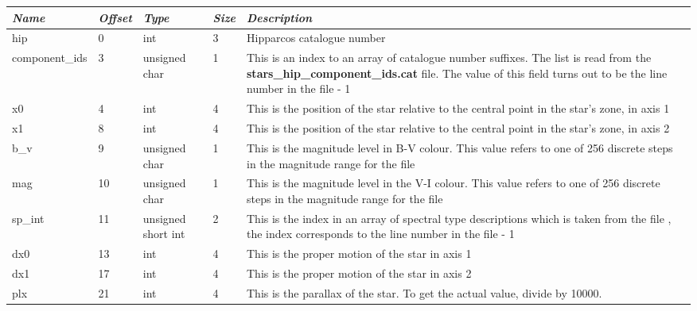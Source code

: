 \begin{longtabu} to \textwidth {l l l l X}\toprule
\emph{Name} & \emph{Offset} & \emph{Type} & \emph{Size} &\emph{Description}\\\midrule
hip            &  0 & int                & 3 & Hipparcos catalogue number\\\midrule
component\_ids &  3 & unsigned char      & 1 & This is an index to an array of catalogue number suffixes. The list is read from the
                                               \textbf{stars\_hip\_component\_ids.cat} file. The value of this field turns out to be the line number in the file - 1\\\midrule
x0             &  4 & int                & 4 & This is the position of the star relative to the central point in the star's zone, in axis 1\\\midrule
x1             &  8 & int                & 4 & This is the position of the star relative to the central point in the star's zone, in axis 2\\\midrule
b\_v           &  9 & unsigned char      & 1 & This is the magnitude level in B-V colour. This value refers to one of 256 discrete steps in the magnitude range for the file\\\midrule
mag            & 10 & unsigned char      & 1 & This is the magnitude level in the V-I colour. This value refers to one of 256 discrete steps in the magnitude range for the file\\\midrule
sp\_int        & 11 & unsigned short int & 2 & This is the index in an array of spectral type descriptions 
                                               which is taken from the file , the index corresponds to the line number in the file - 1\\\midrule
dx0            & 13 & int                & 4 & This is the proper motion of the star in axis 1\\\midrule
dx1            & 17 & int                & 4 & This is the proper motion of the star in axis 2\\\midrule
plx            & 21 & int                & 4 & This is the parallax of the star. To get the actual value, divide by 10000.\\\bottomrule
\end{longtabu}

